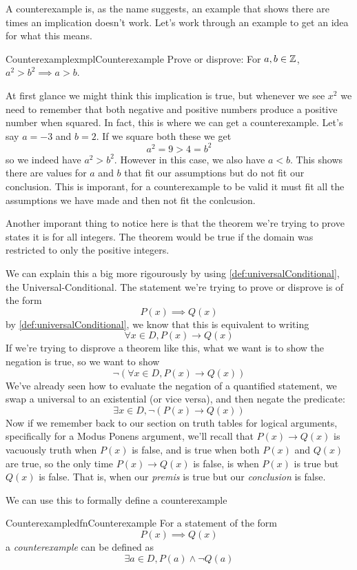 A counterexample is, as the name suggests, an example that shows there are times an implication doesn't work. Let's work through an example to get an idea for what this means.

\begin{exmpl}[label={exmpl:counterexample}]{Counterexample}{xmplCounterexample}
    Prove or disprove: For $a,b \in \mathbb{Z}$, $a^2 > b^2 \implies a > b$.

    At first glance we might think this implication is true, but whenever we see $x^2$ we need to remember that both negative and positive numbers produce a positive number when squared. In fact, this is where we can get a counterexample. Let's say $a = -3$ and $b = 2$. If we square both these we get
    $$a^2  = 9 > 4 = b^2$$
    so we indeed have $a^2 > b^2$. However in this case, we also have $a < b$. This shows there are values for $a$ and $b$ that fit our assumptions but do not fit our conclusion. This is imporant, for a counterexample to be valid it must fit all the assumptions we have made and then not fit the conlcusion.

    Another imporant thing to notice here is that the theorem we're trying to prove states it is for all integers. The theorem would be true if the domain was restricted to only the positive integers.
\end{exmpl}

We can explain this a big more rigourously by using \cref{def:universalConditional}, the Universal-Conditional. The statement we're trying to prove or disprove is of the form
$$P(x) \implies Q(x)$$
by \cref{def:universalConditional}, we know that this is equivalent to writing
$$\forall x \in D, P(x) \to Q(x)$$
If we're trying to disprove a theorem like this, what we want is to show the negation is true, so we want to show
$$\lnot \left(\forall x \in D, P(x) \to Q(x)\right)$$
We've already seen how to evaluate the negation of a quantified statement, we swap a universal to an existential (or vice versa), and then negate the predicate:
$$\exists x \in D, \lnot \left(P(x) \to Q(x)\right)$$
Now if we remember back to our section on truth tables for logical arguments, specifically for a Modus Ponens argument, we'll recall that $P(x) \to Q(x)$ is vacuously truth when $P(x)$ is false, and is true when both $P(x)$ and $Q(x)$ are true, so the only time $P(x) \to Q(x)$ is false, is when $P(x)$ is true but $Q(x)$ is false. That is, when our \emph{premis} is true but our \emph{conclusion} is false.

We can use this to formally define a counterexample

\begin{dfn}[label={def:counterexample}]{Counterexample}{dfnCounterexample}
    For a statement of the form $$P(x) \implies Q(x)$$ a \emph{counterexample} can be defined as
    $$\exists a \in D, P(a) \land \lnot Q(a)$$
\end{dfn}